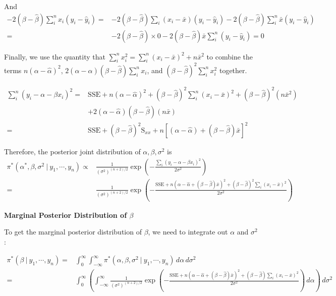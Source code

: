 \documentclass[]{book}
\theoremstyle{definition}
\theoremstyle{definition}
\theoremstyle{definition}
\theoremstyle{remark}
\begin{document}
And \[
\begin{aligned}
-2(\beta-\hat{\beta})\sum_i^n x_i(y_i-\hat{y}_i) = & -2(\beta-\hat{\beta})\sum_i(x_i-\bar{x})(y_i-\hat{y}_i) - 2(\beta-\hat{\beta})\sum_i^n \bar{x}(y_i-\hat{y}_i) \\
= & -2(\beta-\hat{\beta})\times 0 - 2(\beta-\hat{\beta})\bar{x}\sum_i^n(y_i-\hat{y}_i) = 0
\end{aligned}
\]

Finally, we use the quantity that
\(\displaystyle \sum_i^n x_i^2 = \sum_i^n(x_i-\bar{x})^2+ n\bar{x}^2\)
to combine the terms \(n(\alpha-\hat{\alpha})^2\),
\(2\displaystyle (\alpha-\hat{\alpha})(\beta-\hat{\beta})\sum_i^n x_i\),
and \(\displaystyle (\beta-\hat{\beta})^2\sum_i^n x_i^2\) together.

\[
\begin{aligned}
\sum_i^n (y_i-\alpha-\beta x_i)^2 = & \text{SSE} + n(\alpha-\hat{\alpha})^2 +(\beta-\hat{\beta})^2\sum_i^n (x_i-\bar{x})^2 + (\beta-\hat{\beta})^2 (n\bar{x}^2) \\
& +2(\alpha-\hat{\alpha})(\beta-\hat{\beta})(n\bar{x})\\
= & \text{SSE} + (\beta-\hat{\beta})^2\text{S}_{xx} + n\left[(\alpha-\hat{\alpha}) +(\beta-\hat{\beta})\bar{x}\right]^2
\end{aligned}
\]

Therefore, the posterior joint distribution of
\(\alpha, \beta, \sigma^2\) is \[ 
\begin{aligned}
\pi^*(\alpha^*, \beta,\sigma^2 ~|~y_1,\cdots, y_n) \propto & \frac{1}{(\sigma^2)^{(n+2)/2}}\exp\left(-\frac{\sum_i(y_i - \alpha - \beta x_i)^2}{2\sigma^2}\right) \\
= & \frac{1}{(\sigma^2)^{(n+2)/2}}\exp\left(-\frac{\text{SSE} + n(\alpha-\hat{\alpha}+(\beta-\hat{\beta})\bar{x})^2 + (\beta - \hat{\beta})^2\sum_i (x_i-\bar{x})^2}{2\sigma^2}\right)
\end{aligned}
\]

\textbf{Marginal Posterior Distribution of \(\beta\)}

To get the marginal posterior distribution of \(\beta\), we need to
integrate out \(\alpha\) and \(\sigma^2\):

\[
\begin{aligned}
\pi^*(\beta ~|~y_1,\cdots,y_n) = & \int_0^\infty \int_{-\infty}^\infty \pi^*(\alpha, \beta, \sigma^2~|~y_1,\cdots, y_n)\, d\alpha\, d\sigma^2 \\
= & \int_0^\infty \left(\int_{-\infty}^\infty \frac{1}{(\sigma^2)^{(n+2)/2}}\exp\left(-\frac{\text{SSE} + n(\alpha-\hat{\alpha}+(\beta-\hat{\beta})\bar{x})^2+(\beta-\hat{\beta})\sum_i(x_i-\bar{x})^2}{2\sigma^2}\right)\, d\alpha\right)\, d\sigma^2
\end{aligned}
\]
\end{document}
